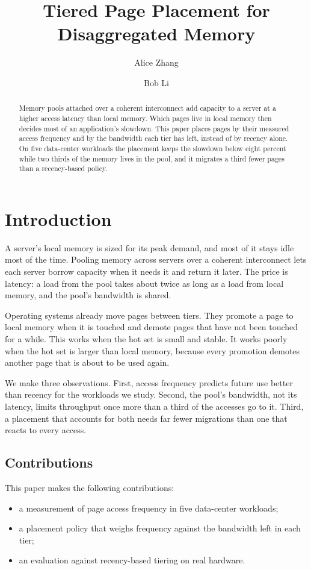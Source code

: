 \documentclass[sigconf,nonacm]{acmart}
\begin{document}
\title{Tiered Page Placement for Disaggregated Memory}
\author{Alice Zhang}
\author{Bob Li}

\begin{abstract}
Memory pools attached over a coherent interconnect add capacity to a server at a higher access
latency than local memory. Which pages live in local memory then decides most of an
application's slowdown. This paper places pages by their measured access frequency and by the
bandwidth each tier has left, instead of by recency alone. On five data-center workloads the
placement keeps the slowdown below eight percent while two thirds of the memory lives in the
pool, and it migrates a third fewer pages than a recency-based policy.
\end{abstract}

\maketitle

\section{Introduction}
A server's local memory is sized for its peak demand, and most of it stays idle most of the
time. Pooling memory across servers over a coherent interconnect lets each server borrow
capacity when it needs it and return it later. The price is latency: a load from the pool takes
about twice as long as a load from local memory, and the pool's bandwidth is shared.

Operating systems already move pages between tiers. They promote a page to local memory when it
is touched and demote pages that have not been touched for a while. This works when the hot set
is small and stable. It works poorly when the hot set is larger than local memory, because every
promotion demotes another page that is about to be used again.

We make three observations. First, access frequency predicts future use better than recency for
the workloads we study. Second, the pool's bandwidth, not its latency, limits throughput once
more than a third of the accesses go to it. Third, a placement that accounts for both needs far
fewer migrations than one that reacts to every access.

\subsection{Contributions}
This paper makes the following contributions:
\begin{itemize}
\item a measurement of page access frequency in five data-center workloads;
\item a placement policy that weighs frequency against the bandwidth left in each tier;
\item an evaluation against recency-based tiering on real hardware.
\end{itemize}
\end{document}
